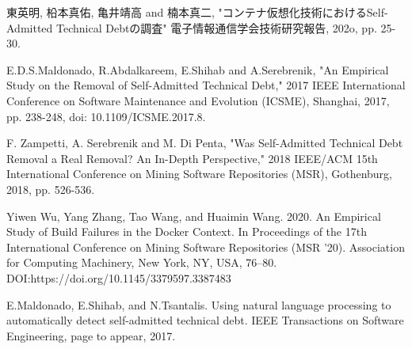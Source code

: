 \documentclass[a4j,10pt,a4paper, fleqn]{jsarticle}\usepackage{stylefile}
\begin{document}
\vspace{-2mm}
\begin{thebibliography}{9}

\vspace{-3mm}

東英明, 柗本真佑, 亀井靖高 and 楠本真二, "コンテナ仮想化技術におけるSelf-Admitted Technical Debtの調査" 電子情報通信学会技術研究報告, 202o, pp. 25-30.

E.D.S.Maldonado, R.Abdalkareem, E.Shihab and A.Serebrenik, "An Empirical Study on the Removal of Self-Admitted Technical Debt," 2017 IEEE International Conference on Software Maintenance and Evolution (ICSME), Shanghai, 2017, pp. 238-248, doi: 10.1109/ICSME.2017.8.

F. Zampetti, A. Serebrenik and M. Di Penta, "Was Self-Admitted Technical Debt Removal a Real Removal? An In-Depth Perspective," 2018 IEEE/ACM 15th International Conference on Mining Software Repositories (MSR), Gothenburg, 2018, pp. 526-536.

Yiwen Wu, Yang Zhang, Tao Wang, and Huaimin Wang. 2020. An Empirical Study of Build Failures in the Docker Context. In Proceedings of the 17th International Conference on Mining Software Repositories (MSR '20). Association for Computing Machinery, New York, NY, USA, 76–80. DOI:https://doi.org/10.1145/3379597.3387483


E.Maldonado, E.Shihab, and N.Tsantalis. Using natural language processing to automatically detect self-admitted technical debt. IEEE Transactions on Software Engineering, page to appear, 2017.







\end{thebibliography}
\vspace{-5mm}
\end{document}
